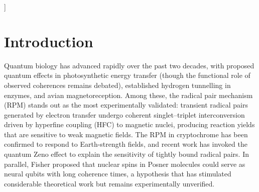 \documentclass[twoside,twocolumn,9pt]{article}
\begin{document}
  ]

\renewcommand*\rmdefault{bch}\normalfont\upshape
\rmfamily
\section*{}
\vspace{-1cm}








\section{Introduction}

Quantum biology has advanced rapidly over the past two decades, with proposed quantum effects in photosynthetic energy transfer\cite{Engel2007,Lambert2013} (though the functional role of observed coherences remains debated), established hydrogen tunnelling in enzymes,\cite{Klinman2013} and avian magnetoreception.\cite{Ritz2000,Maeda2012,Xu2021} Among these, the radical pair mechanism (RPM) stands out as the most experimentally validated: transient radical pairs generated by electron transfer undergo coherent singlet--triplet interconversion driven by hyperfine coupling (HFC) to magnetic nuclei, producing reaction yields that are sensitive to weak magnetic fields.\cite{Hore2016,Steiner1989} The RPM in cryptochrome has been confirmed to respond to Earth-strength fields,\cite{Xu2021,Kattnig2016} and recent work has invoked the quantum Zeno effect to explain the sensitivity of tightly bound radical pairs.\cite{Kattnig2024} In parallel, Fisher proposed that  nuclear spins in Posner molecules could serve as neural qubits with long coherence times,\cite{Fisher2015} a hypothesis that has stimulated considerable theoretical work\cite{Swift2018} but remains experimentally unverified.
\end{document}
